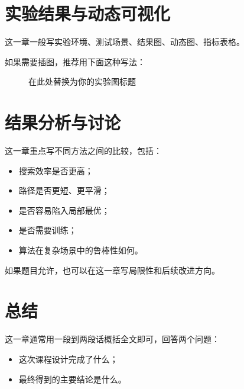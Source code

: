\documentclass[
  oneside,
  degree=bachelor,
  fullwidthstop=false,
  fontset=none,
  times=false,
  minted=false,
  biblatex=false,
]{tongjithesis}
\begin{document}
\chapter{实验结果与动态可视化}
这一章一般写实验环境、测试场景、结果图、动态图、指标表格。

如果需要插图，推荐用下面这种写法：

\begin{figure}[H]
  \centering
  \caption{在此处替换为你的实验图标题}
\end{figure}

\chapter{结果分析与讨论}
这一章重点写不同方法之间的比较，包括：
\begin{itemize}
  \item 搜索效率是否更高；
  \item 路径是否更短、更平滑；
  \item 是否容易陷入局部最优；
  \item 是否需要训练；
  \item 算法在复杂场景中的鲁棒性如何。
\end{itemize}

如果题目允许，也可以在这一章写局限性和后续改进方向。

\chapter{总结}
这一章通常用一段到两段话概括全文即可，回答两个问题：
\begin{itemize}
  \item 这次课程设计完成了什么；
  \item 最终得到的主要结论是什么。
\end{itemize}
\end{document}
